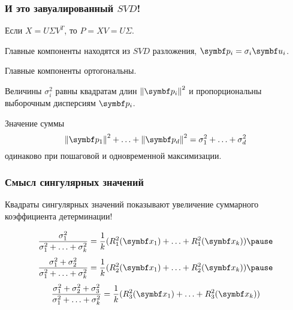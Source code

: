 \begin{frame}
  \frametitle{И это завуалированный $SVD$!}

  Если $X = U\Sigma V^T$, то $P = XV = U\Sigma$.

  Главные компоненты находятся из $SVD$ разложения, $\bp_i = \sigma_i \bu_i$. 

  Главные компоненты ортогональны. 

  Величины $\sigma^2_i$ равны квадратам длин $\norm{\bp_i}^2$ 
  и пропорциональны выборочным дисперсиям $\bp_i$.  \pause

Значение суммы 
\[
  \norm{\bp_1}^2 + \ldots + \norm{\bp_d}^2 = \sigma^2_1 + \ldots + \sigma^2_d
\]
одинаково при пошаговой и одновременной максимизации.


\end{frame}


\begin{frame}
  \frametitle{Смысл сингулярных значений}

  Квадраты сингулярных значений показывают увеличение суммарного коэффициента детерминации!


\[
 \frac{\sigma^2_1}{\sigma^2_1 + \ldots + \sigma^2_k} = \frac{1}{k} (R_1^2(\bx_1) + \ldots + R_1^2(\bx_k))  \pause 
 \]
 \[
 \frac{\sigma^2_1 + \sigma^2_2}{\sigma^2_1 + \ldots + \sigma^2_k} = \frac{1}{k} (R_2^2(\bx_1) + \ldots + R_2^2(\bx_k)) \pause
 \]
\[
 \frac{\sigma^2_1 + \sigma^2_2 + \sigma^2_3}{\sigma^2_1 + \ldots + \sigma^2_k} = \frac{1}{k} (R_3^2(\bx_1) + \ldots + R_3^2(\bx_k))  
 \]

  

\end{frame}



